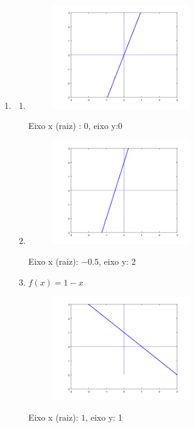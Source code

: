 \documentclass[11pt]{article}
\begin{document}
\begin{enumerate}
	\item 
		\begin{enumerate}
			\item
				\begin{figure}[H]
				\centering
				\includegraphics[width=0.6\textwidth]{imgs/explot1.png}
				\end{figure}
				Eixo x (raiz) : 0, eixo y:0
			\item
				\begin{figure}[H]
				\centering
				\includegraphics[width=0.6\textwidth]{imgs/explot2.png}
				\end{figure}
				Eixo x (raiz): $-0.5$, eixo y: 2
			\item $f(x) = 1 - x$
				\begin{figure}[H]
				\centering
				\includegraphics[width=0.6\textwidth]{imgs/explot3.png}
				\end{figure}
				Eixo x (raiz): $1$, eixo y: 1
		\end{enumerate}


\end{enumerate}
\end{document}
